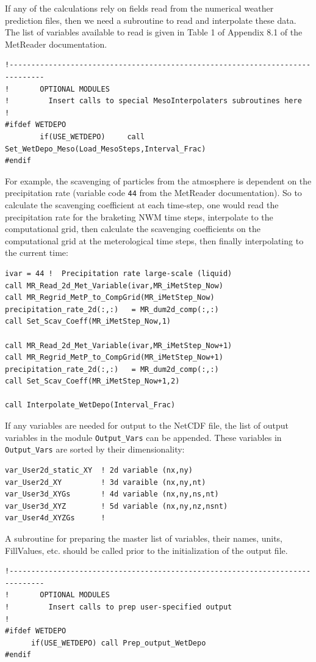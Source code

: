 If any of the calculations rely on fields read from the numerical weather
prediction files, then we need a subroutine to read and interpolate these
data.  The list of variables available to read is given in Table 1 of Appendix 8.1
of the MetReader documentation.
\small
\begin{verbatim}
!------------------------------------------------------------------------------
!       OPTIONAL MODULES
!         Insert calls to special MesoInterpolaters subroutines here
!
#ifdef WETDEPO
        if(USE_WETDEPO)     call Set_WetDepo_Meso(Load_MesoSteps,Interval_Frac)
#endif
\end{verbatim}
\normalsize
For example, the scavenging of particles from the atmosphere is dependent on
the precipitation rate (variable code \texttt{44} from the MetReader documentation).
So to calculate the scavenging coefficient at each time-step, one would read the
precipitation rate for the braketing NWM time steps, interpolate to the computational
grid, then calculate the scavenging coefficients on the computational grid at the
meterological time steps, then finally interpolating to the current time:
\small
\begin{verbatim}
ivar = 44 !  Precipitation rate large-scale (liquid)
call MR_Read_2d_Met_Variable(ivar,MR_iMetStep_Now)
call MR_Regrid_MetP_to_CompGrid(MR_iMetStep_Now)
precipitation_rate_2d(:,:)   = MR_dum2d_comp(:,:)
call Set_Scav_Coeff(MR_iMetStep_Now,1)

call MR_Read_2d_Met_Variable(ivar,MR_iMetStep_Now+1)
call MR_Regrid_MetP_to_CompGrid(MR_iMetStep_Now+1)
precipitation_rate_2d(:,:)   = MR_dum2d_comp(:,:)
call Set_Scav_Coeff(MR_iMetStep_Now+1,2)

call Interpolate_WetDepo(Interval_Frac)
\end{verbatim}
\normalsize
If any variables are needed for output to the NetCDF file, the list of output
variables in the module \texttt{Output\_Vars} can be appended.  These variables
in \texttt{Output\_Vars} are sorted by their dimensionality:
\small
\begin{verbatim}
var_User2d_static_XY  ! 2d variable (nx,ny)
var_User2d_XY         ! 3d varaible (nx,ny,nt)
var_User3d_XYGs       ! 4d variable (nx,ny,ns,nt)
var_User3d_XYZ        ! 5d variable (nx,ny,nz,nsnt)
var_User4d_XYZGs      ! 
\end{verbatim}
\normalsize
A subroutine for preparing the master list of variables, their names, units,
FillValues, etc. should be called prior to the initialization of the output file.
\small
\begin{verbatim}
!------------------------------------------------------------------------------
!       OPTIONAL MODULES
!         Insert calls to prep user-specified output
!
#ifdef WETDEPO
      if(USE_WETDEPO) call Prep_output_WetDepo
#endif
\end{verbatim}
\normalsize

